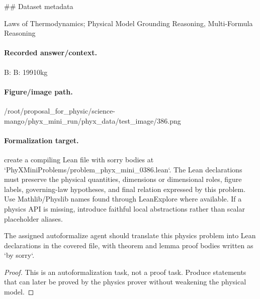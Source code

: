 \#\# Dataset metadata

Laws of Thermodynamics; Physical Model Grounding Reasoning, Multi-Formula Reasoning

\paragraph{Recorded answer/context.}
B: B: 19910kg

\paragraph{Figure/image path.}
/root/proposal\_for\_physic/science-mango/phyx\_mini\_run/phyx\_data/test\_image/386.png

\paragraph{Formalization target.}
create a compiling Lean file with sorry bodies at `PhyXMiniProblems/problem\_phyx\_mini\_0386.lean`. The Lean declarations must preserve the physical quantities, dimensions or dimensional roles, figure labels, governing-law hypotheses, and final relation expressed by this problem.
Use Mathlib/Physlib names found through LeanExplore where available. If a physics API is missing, introduce faithful local abstractions rather than scalar placeholder aliases.

\begin{theorem}
\label{thm:physics:phyx_mini_0386:target}
The assigned autoformalize agent should translate this physics problem into Lean declarations in the covered file, with theorem and lemma proof bodies written as `by sorry`.
\end{theorem}
\begin{proof}
This is an autoformalization task, not a proof task. Produce statements that can later be proved by the physics prover without weakening the physical model.
\end{proof}

